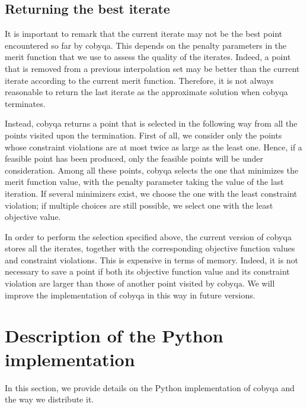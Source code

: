 \subsection{Returning the best iterate}

It is important to remark that the current iterate may not be the best point encountered so far by \gls{cobyqa}.
This depends on the penalty parameters in the merit function that we use to assess the quality of the iterates.
Indeed, a point that is removed from a previous interpolation set may be better than the current iterate according to the current merit function.
Therefore, it is not always reasonable to return the last iterate as the approximate solution when \gls{cobyqa} terminates.

Instead, \gls{cobyqa} returns a point that is selected in the following way from all the points visited upon the termination.
First of all, we consider only the points whose constraint violations are at most twice as large as the least one.
Hence, if a feasible point has been produced, only the feasible points will be under consideration.
Among all these points, \gls{cobyqa} selects the one that minimizes the merit function value, with the penalty parameter taking the value of the last iteration.
If several minimizers exist, we choose the one with the least constraint violation; 
if multiple choices are still possible, we select one with the least objective value.

In order to perform the selection specified above, the current version of \gls{cobyqa} stores all the iterates, together with the corresponding objective function values and constraint violations.
This is expensive in terms of memory.
Indeed, it is not necessary to save a point if both its objective function value and its constraint violation are larger than those of another point visited by \gls{cobyqa}.
We will improve the implementation of \gls{cobyqa} in this way in future versions.

\section{Description of the Python implementation}
\label{sec:python-implementation}

In this section, we provide details on the Python implementation of \gls{cobyqa} and the way we distribute it.

